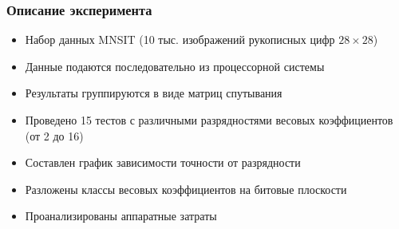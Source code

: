 \begin{frame}[t]
\frametitle{Описание эксперимента}
\begin{itemize}
    \item Набор данных MNSIT (10 тыс. изображений рукописных цифр $28 \times 28$)
    \item Данные подаются последовательно из процессорной системы
    \item Результаты группируются в виде матриц спутывания
    \item Проведено 15 тестов с различными разрядностями весовых коэффициентов (от 2 до 16)
    \item Составлен график зависимости точности от разрядности
    \item Разложены классы весовых коэффициентов на битовые плоскости
    \item Проанализированы аппаратные затраты
\end{itemize}

\end{frame}

